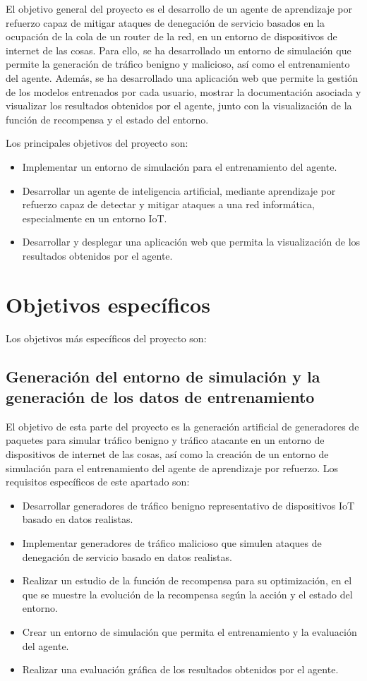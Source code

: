 El objetivo general del proyecto es el desarrollo de un agente de aprendizaje por refuerzo capaz de mitigar ataques de denegación de servicio basados en la ocupación de la cola de un router de la red, en un entorno de dispositivos de internet de las cosas. Para ello, se ha desarrollado un entorno de simulación que permite la generación de tráfico benigno y malicioso, así como el entrenamiento del agente. Además, se ha desarrollado una aplicación web que permite la gestión de los modelos entrenados por cada usuario, mostrar la documentación asociada y visualizar los resultados obtenidos por el agente, junto con la visualización de la función de recompensa y el estado del entorno.

Los principales objetivos del proyecto son:
\begin{itemize}
    \item Implementar un entorno de simulación para el entrenamiento del agente.
    \item Desarrollar un agente de inteligencia artificial, mediante aprendizaje por refuerzo capaz de detectar y mitigar ataques a una red informática, especialmente en un entorno IoT.
    \item Desarrollar y desplegar una aplicación web que permita la visualización de los resultados obtenidos por el agente.
\end{itemize}

\section{Objetivos específicos}
Los objetivos más específicos del proyecto son:

\subsection{Generación del entorno de simulación y la generación de los datos de entrenamiento}
El objetivo de esta parte del proyecto es la generación artificial de generadores de paquetes para simular tráfico benigno y tráfico atacante en un entorno de dispositivos de internet de las cosas, así como la creación de un entorno de simulación para el entrenamiento del agente de aprendizaje por refuerzo. Los requisitos específicos de este apartado son:
\begin{itemize}
    \item Desarrollar generadores de tráfico benigno representativo de dispositivos IoT basado en datos realistas.
    \item Implementar generadores de tráfico malicioso que simulen ataques de denegación de servicio basado en datos realistas.
    \item Realizar un estudio de la función de recompensa para su optimización, en el que se muestre la evolución de la recompensa según la acción y el estado del entorno.
    \item Crear un entorno de simulación que permita el entrenamiento y la evaluación del agente.
    \item Realizar una evaluación gráfica de los resultados obtenidos por el agente.
\end{itemize}

